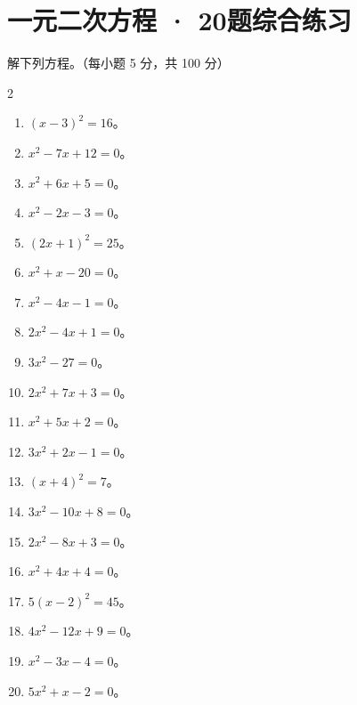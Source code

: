 \documentclass{exam-zh}
\newcommand{\twocolitem}[1]{%
  \item #1\par\vspace{15mm}%
}
\begin{document}
\section*{一元二次方程 · 20题综合练习}

\begin{problem}[points=100]
解下列方程。（每小题 5 分，共 100 分）

\begin{multicols}{2}
\begin{enumerate}
  \twocolitem{$(x-3)^2=16$。}
  \twocolitem{$x^2-7x+12=0$。}
  \twocolitem{$x^2+6x+5=0$。}
  \twocolitem{$x^2-2x-3=0$。}
  \twocolitem{$(2x+1)^2=25$。}
  \twocolitem{$x^2+x-20=0$。}
  \twocolitem{$x^2-4x-1=0$。}
  \twocolitem{$2x^2-4x+1=0$。}
  \twocolitem{$3x^2-27=0$。}
  \twocolitem{$2x^2+7x+3=0$。}
  \twocolitem{$x^2+5x+2=0$。}
  \twocolitem{$3x^2+2x-1=0$。}
  \twocolitem{$(x+4)^2=7$。}
  \twocolitem{$3x^2-10x+8=0$。}
  \twocolitem{$2x^2-8x+3=0$。}
  \twocolitem{$x^2+4x+4=0$。}
  \twocolitem{$5(x-2)^2=45$。}
  \twocolitem{$4x^2-12x+9=0$。}
  \twocolitem{$x^2-3x-4=0$。}
  \twocolitem{$5x^2+x-2=0$。}
\end{enumerate}
\end{multicols}
\end{problem}
\end{document}
